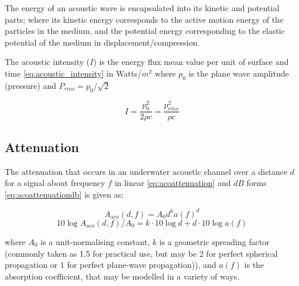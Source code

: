 The energy of an acoustic wave is encapsulated into its kinetic and potential parts; where its kinetic energy corresponds to the active motion energy of the particles in the medium, and the potential energy corresponding to the elastic potential of the medium in displacement/compression.

The acoustic intensity ($I$) is the energy flux mean value per unit of surface and time \eqref{eq:acoustic_intensity} in Watts/$m^2$ where $p_0$ is the plane wave amplitude (pressure) and $P_{rms} = p_0/\sqrt{2}$

\begin{equation}
  I = \frac{p_0^2}{2\rho c} = \frac{p_{rms}^2}{\rho c}
  \label{eq:acoustic_intensity}
\end{equation}

\subsection{Attenuation}

The attenuation that occurs in an underwater acoustic channel over a distance $d$ for a signal about frequency $f$ in linear \eqref{eq:acoattenuation} and $dB$ forms \eqref{eq:acoattenuationdb} is given as;

\begin{equation}
  \label{eq:acoattenuation}
  A_{\text{aco}}(d,f) = A_0d^ka(f)^d
\end{equation}
\begin{equation}
  \label{eq:acoattenuationdb}
  10 \log A_{\text{aco}}(d,f)/A_0 = k \cdot 10 \log d + d \cdot 10 \log a(f)
\end{equation}

where $A_0$ is a unit-normalising constant, $k$ is a geometric spreading factor (commonly taken as 1.5 for practical use, but may be 2 for perfect spherical propagation or 1 for perfect plane-wave propagation)), and $a(f)$ is the absorption coefficient, that may be modelled in a variety of ways.

